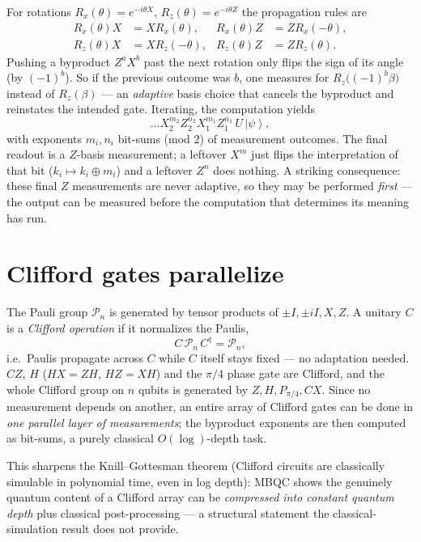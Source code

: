 \documentclass[11pt]{article}
\newcommand{\ket}[1]{\left|#1\right\rangle}
\theoremstyle{plain}
\begin{document}
For rotations $R_x(\theta)=e^{-i\theta X}$, $R_z(\theta)=e^{-i\theta Z}$ the propagation rules are
\begin{align*}
R_x(\theta)X &= X R_x(\theta), & R_x(\theta)Z &= Z R_x(-\theta),\\
R_z(\theta)X &= X R_z(-\theta), & R_z(\theta)Z &= Z R_z(\theta).
\end{align*}
Pushing a byproduct $Z^aX^b$ past the next rotation only flips the sign of its angle (by $(-1)^b$).
So if the previous outcome was $b$, one measures for $R_z\big((-1)^b\beta\big)$ instead of
$R_z(\beta)$ --- an \emph{adaptive} basis choice that cancels the byproduct and reinstates the
intended gate. Iterating, the computation yields
\[ \dots X_2^{m_2} Z_2^{n_2} X_1^{m_1} Z_1^{n_1}\, U\,\ket{\psi}, \]
with exponents $m_i, n_i$ bit-sums (mod $2$) of measurement outcomes. The final readout is a
$Z$-basis measurement; a leftover $X^{m}$ just flips the interpretation of that bit
($k_i \mapsto k_i\oplus m_i$) and a leftover $Z^{n}$ does nothing. A striking consequence: these
final $Z$ measurements are never adaptive, so they may be performed \emph{first} --- the output can
be measured before the computation that determines its meaning has run.

\section{Clifford gates parallelize}
The Pauli group $\mathcal P_n$ is generated by tensor products of $\pm I, \pm iI, X, Z$. A unitary
$C$ is a \emph{Clifford operation} if it normalizes the Paulis,
\[ C\,\mathcal P_n\, C^\dagger = \mathcal P_n, \]
i.e.\ Paulis propagate across $C$ while $C$ itself stays fixed --- no adaptation needed. $CZ$,
$H$ ($HX=ZH$, $HZ=XH$) and the $\pi/4$ phase gate are Clifford, and the whole Clifford group on
$n$ qubits is generated by $Z, H, P_{\pi/4}, CX$. Since no measurement depends on another, an entire
array of Clifford gates can be done in \emph{one parallel layer of measurements}; the byproduct
exponents are then computed as bit-sums, a purely classical $O(\log)$-depth task.

This sharpens the Knill--Gottesman theorem (Clifford circuits are classically simulable in
polynomial time, even in log depth): MBQC shows the genuinely quantum content of a Clifford array
can be \emph{compressed into constant quantum depth} plus classical post-processing --- a structural
statement the classical-simulation result does not provide.
\end{document}
